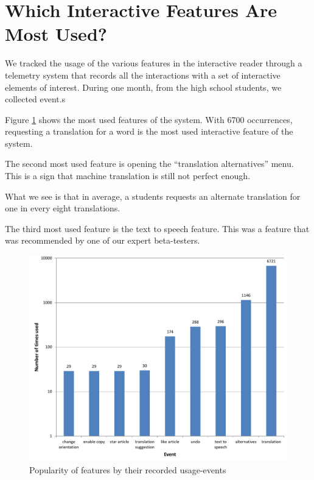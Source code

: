 

\newpage
\section{Which Interactive Features Are Most Used?}
We tracked the usage of the various features in the interactive reader through a telemetry system that records all the interactions with a set of interactive elements of interest. During one month, from the high school students, we collected \eventCount event.s 

Figure \ref{fig:feature_usage} shows the most used features of the system. With 6700 occurrences, requesting a translation for a word is the most used interactive feature of the system. 

The second most used feature is opening the ``translation alternatives'' menu. This is a sign that machine translation is still not perfect enough. 

What we see is that in average, a students requests an alternate translation for one in every eight translations. 

The third most used feature is the text to speech feature. This was a feature that was recommended by one of our expert beta-testers. 

\begin{figure}[h!]
\centering
  \includegraphics[width=0.9\columnwidth]{figures/reader_feature_usage}
  \caption{Popularity of features by their recorded usage-events}
  \label{fig:feature_usage}
\end{figure}

